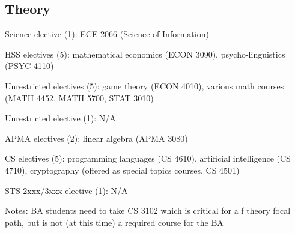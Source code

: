 \subsection{Theory}
\begin{itemlist}
\item Science elective (1): ECE 2066 (Science of Information)
\item HSS electives (5): mathematical economics (ECON 3090),
  psycho-linguistics (PSYC 4110)
\item Unrestricted electives (5): game theory (ECON 4010), various math
  courses (MATH 4452, MATH 5700, STAT 3010)
\item Unrestricted elective (1): N/A
\item APMA electives (2): linear algebra (APMA 3080)
\item CS electives (5): programming languages (CS 4610), artificial
  intelligence (CS 4710), cryptography (offered as special topics
  courses, CS 4501)
\item STS 2xxx/3xxx elective (1): N/A
\item Notes: BA students need to take CS 3102 which is critical for a
f  theory focal path, but is not (at this time) a required course for
  the BA
\end{itemlist}

